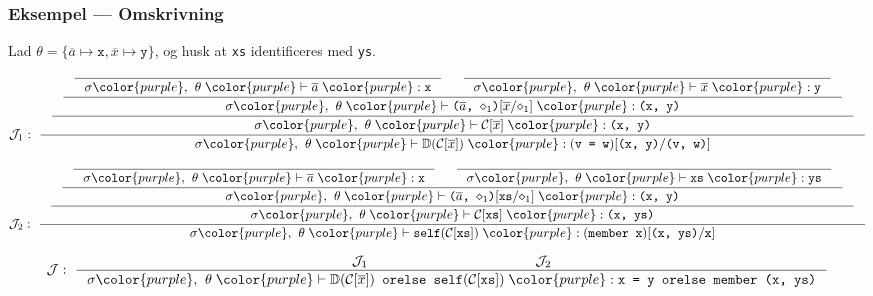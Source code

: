 \documentclass[slidestop,compress,mathserif, xcolor=dvipsnames]{beamer}
\newcommand{\ttt}[1]{\texttt{#1}}
\newcommand{\ol}[1]{\overline{#1}}
\def\TheTrueColour{purple}
\newcommand{\cc}[1]{{\color{\TheTrueColour}#1}}
\newcommand{\matchbody}[4]{\ensuremath{#1\cc{,}\mathrel{ }#2\mathrel{\cc{|-}}#3\mathrel{\cc{:}}#4}}
\begin{document}
\begin{frame}[fragile]
  \frametitle{Eksempel --- Omskrivning}

  \center\tiny Lad $\theta = \{\ol{a} \mapsto \ttt{x}, \ol{x} \mapsto
  \ttt{y}\}$, og husk at \ttt{xs} identificeres med \ttt{ys}.
  \begin{block}{}
    \tiny
    \[
    \mathcal{J}_1:\
    \inference
    {
      \inference
      {
        \inference
        {
          \inference
          {
          }
          {
            \matchbody
            {\sigma}
            {\theta}
            {\ol{a}}
            {\ttt{x}}
          } &
          \inference
          {
          }
          {
            \matchbody
            {\sigma}
            {\theta}
            {\ol{x}}
            {\ttt{y}}
          }
        }
        {
          \matchbody
          {\sigma}
          {\theta}
          {\ttt{($\ol{a}$, $\diamond_1$)$[\ol{x}/\diamond_1]$}}
          {\ttt{(x, y)}}
        }
      }
      {
        \matchbody
        {\sigma}
        {\theta}
        {\mathcal{C}[\ol{x}]}
        {\ttt{(x, y)}}
      }
    }
    {
      \matchbody
      {\sigma}
      {\theta}
      {\mathbb{D}(\mathcal{C}[\ol{x}])}
      {\ttt{$($v = w$)[$(x, y)$/$(v, w)$]$}}
    }
    \]
  \end{block}
  \begin{block}{}
    \[
    \mathcal{J}_2:\
    \inference
    {
      \inference
      {
        \inference
        {
          \inference
          {
          }
          {
            \matchbody
            {\sigma}
            {\theta}
            {\ol{a}}
            {\ttt{x}}
          } &
          \inference
          {
          }
          {
            \matchbody
            {\sigma}
            {\theta}
            {\ttt{xs}}
            {\ttt{ys}}
          }
        }
        {
          \matchbody
          {\sigma}
          {\theta}
          {\ttt{($\ol{a}$, $\diamond_1$)$[$xs$/\diamond_1]$}}
          {\ttt{(x, y)}}
        }
      }
      {
        \matchbody
        {\sigma}
        {\theta}
        {\ttt{$\mathcal{C}[$xs$]$}}
        {\ttt{(x, ys)}}
      }
    }
    {
      \matchbody
      {\sigma}
      {\theta}
      {\ttt{self$(\mathcal{C}[$xs$])$}}
      {\ttt{$($member x$)[$(x, ys)$/$x$]$}}
    }
    \]
  \end{block}
  \begin{block}{}
    \tiny
    \[
    \mathcal{J}:\
    \inference
    {\mathcal{J}_1 & & & & & & & & \mathcal{J}_2}
    {
      \matchbody
      {\sigma}
      {\theta}
      {\ttt{$\mathbb{D}(\mathcal{C}[\ol{x}])$ orelse self$(\mathcal{C}[$xs$])$}}
      {\ttt{x = y orelse member (x, ys)}}
    }
    \]
  \end{block}
\end{frame}
\end{document}

